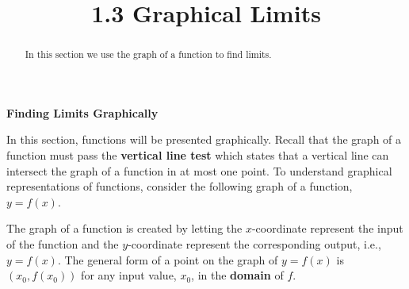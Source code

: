 \documentclass[handout]{ximera}
\title{1.3 Graphical Limits}
\begin{document}
\begin{abstract}
In this section we use the graph of a function to find limits.
\end{abstract}

\maketitle







\begin{center}
\textbf{Finding Limits Graphically}
\end{center}


\begin{center}
\begin{foldable}
\end{foldable}
\end{center}







In this section, functions will be presented graphically. Recall that the graph of a 
function must pass the \textbf{vertical line test} which states that a vertical line 
can intersect the graph of a function in at most one point.
To understand graphical representations of functions, consider the following graph of a function, $y = f(x)$.








The graph of a function is created by letting the $x$-coordinate represent 
the input of the function and the $y$-coordinate represent the corresponding output, i.e., $y = f(x)$.  The general form of a point on the graph of $y = f(x)$ is 
$(x_0, f(x_0))$ for any input value, $x_0$, in the \textbf{domain} of $f$.\\
\end{document}
